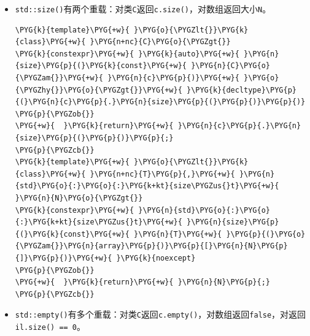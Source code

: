 \begin{itemize}

\item \texttt{std::\allowbreak{}size()}有两个重载：对类\texttt{C}返回\texttt{c.\allowbreak{}size()}，对数组返回大小\texttt{N}。



\begin{codeblockbg}
\begin{Verbatim}[commandchars=\\\{\},breaklines=true,breakanywhere=true,fontsize=\codefont,xleftmargin=17bp]
\PYG{k}{template}\PYG{+w}{ }\PYG{o}{\PYGZlt{}}\PYG{k}{class}\PYG{+w}{ }\PYG{n+nc}{C}\PYG{o}{\PYGZgt{}}
\PYG{k}{constexpr}\PYG{+w}{ }\PYG{k}{auto}\PYG{+w}{ }\PYG{n}{size}\PYG{p}{(}\PYG{k}{const}\PYG{+w}{ }\PYG{n}{C}\PYG{o}{\PYGZam{}}\PYG{+w}{ }\PYG{n}{c}\PYG{p}{)}\PYG{+w}{ }\PYG{o}{\PYGZhy{}}\PYG{o}{\PYGZgt{}}\PYG{+w}{ }\PYG{k}{decltype}\PYG{p}{(}\PYG{n}{c}\PYG{p}{.}\PYG{n}{size}\PYG{p}{(}\PYG{p}{)}\PYG{p}{)}
\PYG{p}{\PYGZob{}}
\PYG{+w}{  }\PYG{k}{return}\PYG{+w}{ }\PYG{n}{c}\PYG{p}{.}\PYG{n}{size}\PYG{p}{(}\PYG{p}{)}\PYG{p}{;}
\PYG{p}{\PYGZcb{}}
\PYG{k}{template}\PYG{+w}{ }\PYG{o}{\PYGZlt{}}\PYG{k}{class}\PYG{+w}{ }\PYG{n+nc}{T}\PYG{p}{,}\PYG{+w}{ }\PYG{n}{std}\PYG{o}{:}\PYG{o}{:}\PYG{k+kt}{size\PYGZus{}t}\PYG{+w}{ }\PYG{n}{N}\PYG{o}{\PYGZgt{}}
\PYG{k}{constexpr}\PYG{+w}{ }\PYG{n}{std}\PYG{o}{:}\PYG{o}{:}\PYG{k+kt}{size\PYGZus{}t}\PYG{+w}{ }\PYG{n}{size}\PYG{p}{(}\PYG{k}{const}\PYG{+w}{ }\PYG{n}{T}\PYG{+w}{ }\PYG{p}{(}\PYG{o}{\PYGZam{}}\PYG{n}{array}\PYG{p}{)}\PYG{p}{[}\PYG{n}{N}\PYG{p}{]}\PYG{p}{)}\PYG{+w}{ }\PYG{k}{noexcept}
\PYG{p}{\PYGZob{}}
\PYG{+w}{  }\PYG{k}{return}\PYG{+w}{ }\PYG{n}{N}\PYG{p}{;}
\PYG{p}{\PYGZcb{}}
\end{Verbatim}
\end{codeblockbg}



\item \texttt{std::\allowbreak{}empty()}有多个重载：对类\texttt{C}返回\texttt{c.\allowbreak{}empty()}，对数组返回\texttt{false}，对返回\texttt{il.\allowbreak{}size() == 0}。




\end{itemize}
